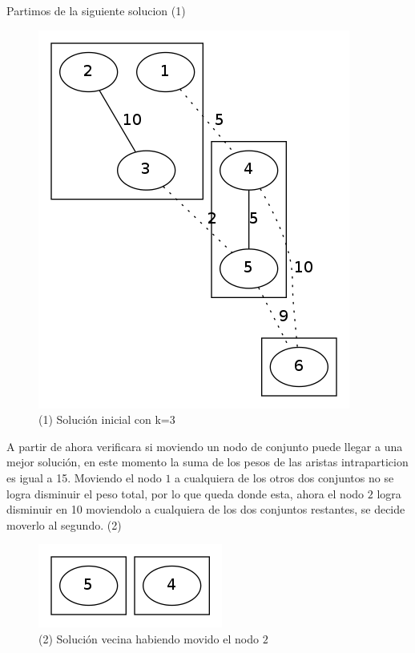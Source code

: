 Partimos de la siguiente solucion (1)
\begin{figure}[H]
\begin{center}
\includegraphics[scale=0.4]{./img/local1.png}
\caption{(1) Solución inicial con k=3}
\end{center}
\end{figure}

A partir de ahora verificara si moviendo un nodo de conjunto puede llegar a una mejor solución, en este momento la suma de los pesos de las aristas intraparticion es igual a 15. Moviendo el nodo $1$ a cualquiera de los otros dos conjuntos no se logra disminuir el peso total, por lo que queda donde esta, ahora el nodo $2$ logra disminuir en 10 moviendolo a cualquiera de los dos conjuntos restantes, se decide moverlo al segundo. (2)

\begin{figure}[H]
\begin{center}
\includegraphics[scale=0.4]{./img/greedy2.png}
\caption{(2) Solución vecina habiendo movido el nodo $2$}
\end{center}
\end{figure}


